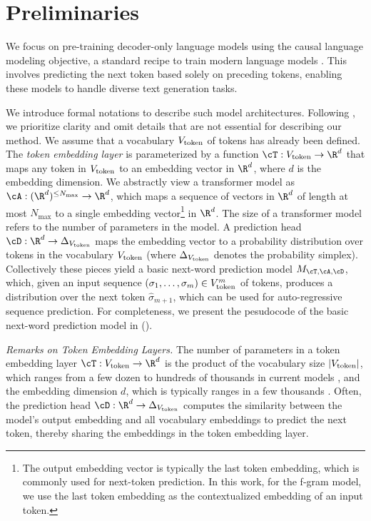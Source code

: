 


\section{Preliminaries}\label{sec:preliminary}

We focus on pre-training decoder-only language models using the causal language modeling objective, a standard recipe to train modern language models \citep{radford2019language,brown2020language}. This involves predicting the next token based solely on preceding tokens, enabling these models to handle diverse text generation tasks. 


We introduce formal notations to describe such model architectures. Following \citet{phuong22formal}, we prioritize clarity and omit details that are not essential for describing our method.
We assume that a vocabulary $V_{\mathrm{token}}$ of tokens has already been defined.
The {\em token embedding layer} is parameterized by a function $\cT : \Vtoken \to \R^d$ that maps any token in $V_{\mathrm{token}}$ to an embedding vector in $\R^{d}$, where $d$ is the embedding dimension. 
We abstractly view a transformer model as $\cA : (\R^{d})^{\le N_{\max}} \to \R^{d}$, which maps a sequence of vectors in $\R^d$ of length at most $N_{\max}$ to a single embedding vector\footnote{The output embedding vector is typically the last token embedding, which is commonly used for next-token prediction. In this work, for the f-gram model, we use the last token embedding as the contextualized embedding of an input token.} in $\R^d$. The size of a transformer model refers to the number of parameters in the model.
A prediction head $\cD : \R^d \to \Delta_{\Vtoken}$ maps the embedding vector to a probability distribution over tokens in the vocabulary $V_{\mathrm{token}}$ (where $\Delta_{V_{\mathrm{token}}}$ denotes the probability simplex). Collectively these pieces yield a basic next-word prediction model $M_{\cT,\cA,\cD}$, which, given an input sequence $(\sigma_1, \ldots, \sigma_m) \in V_{\mathrm{token}}^m$ of tokens, produces a distribution over the next token $\hat{\sigma}_{m+1}$, which can be used for auto-regressive sequence prediction. For completeness, we present the pesudocode of the basic next-word prediction model in  ().




{\em Remarks on Token Embedding Layers.}
The number of parameters in a token embedding layer $\cT : \Vtoken \to \R^d$ is the product of the vocabulary size $|V_{\mathrm{token}}|$, which ranges from a few dozen to hundreds of thousands in current models \citep{radford2019language, dubey2024llama}, and the embedding dimension $d$, which is typically ranges in a few thousands \citep{brown2020language, touvron2023llama}. 
Often, the prediction head $\cD : \R^d \to \Delta_{\Vtoken}$ computes the similarity between the model's output embedding and all vocabulary embeddings to predict the next token, thereby sharing the embeddings in the token embedding layer.

